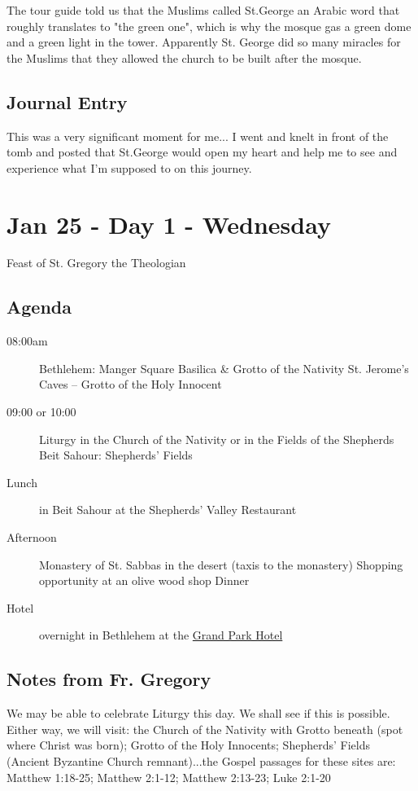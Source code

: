 \documentclass[letterpaper]{report}
\begin{document}
The tour guide told us that the Muslims called St.George an Arabic word that roughly translates to "the green one", which is why the mosque gas a green dome and a green light in the tower. Apparently St. George did so many miracles for the Muslims that they allowed the church to be built after the mosque.


\clearpage
\subsection{Journal Entry}
This was a very significant moment for me... I went and knelt in front of the tomb and posted that St.George would open my heart and help me to see and experience what I'm supposed to on this journey.

\clearpage
\section{Jan 25 - Day 1 - Wednesday}
Feast of St. Gregory the Theologian

\subsection{Agenda}
\begin{description}
	\item[08:00am] Bethlehem: Manger Square
	    \subitem Basilica \& Grotto of the Nativity
	    \subitem St. Jerome's Caves – Grotto of the Holy Innocent
	\item[09:00 or 10:00] Liturgy in the Church of the Nativity or in the 
		Fields of the Shepherds
		\subitem Beit Sahour: Shepherds’ Fields
	\item[Lunch] in Beit Sahour at the Shepherds’ Valley Restaurant 
	\item[Afternoon] Monastery of St. Sabbas in the desert 
	    (taxis to the monastery)
	    \subitem Shopping opportunity at an olive wood shop Dinner 
	    
	\item[Hotel] overnight in Bethlehem at the
	  \href{http://www.grandpark.com/bethlehem/}{Grand Park Hotel}
\end{description}

\subsection{Notes from Fr. Gregory}
We may be able to celebrate Liturgy this day. We shall see if this is possible. Either way, we will visit: the Church of the Nativity with Grotto beneath (spot where Christ was born); Grotto of the Holy Innocents; Shepherds' Fields (Ancient Byzantine Church remnant)...the Gospel passages for these sites are: 
Matthew 1:18-25; Matthew 2:1-12; Matthew 2:13-23; Luke 2:1-20
\end{document}

